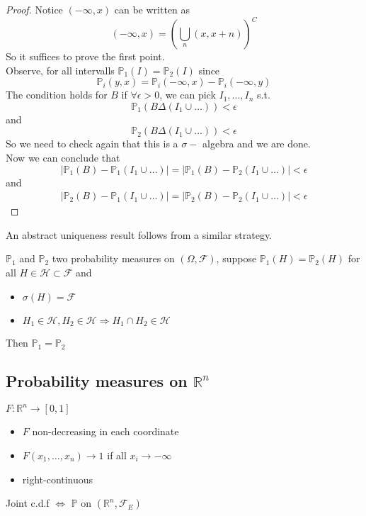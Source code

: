 \documentclass[../main.tex]{subfiles}
\begin{document}
\begin{proof}
	Notice $ ( - \infty , x) $ can be written as
	\[ 
		( - \infty , x) = ( \bigcup_n ( x,x+n)  )^{C}
	\]
	So it suffices to prove the first point.\\
	Observe, for all intervalls $ \mathbb{P}_1 ( I) = \mathbb{P}_2 ( I) $ since
	\[ 
		\mathbb{P}_i ( y,x) = \mathbb{P}_i ( - \infty , x) - \mathbb{P}_i ( - \infty , y) 
	\]
	The condition holds for $B$ if $\forall \epsilon>0$, we can pick $I_1,\ldots, I_n$ s.t.
	\[ 
		\mathbb{P}_1( B\Delta ( I_1\cup\ldots) ) < \epsilon
	\]
	and 
	\[ 
		\mathbb{P}_2( B\Delta( I_1\cup \ldots) ) <\epsilon
	\]
	So we need to check again that this is  a $\sigma-$ algebra and we are done.\\
	Now we can conclude that
	\[ 
		| \mathbb{P}_1( B) -\mathbb{P}_1( I_1\cup \ldots) | = | \mathbb{P}_1( B) - \mathbb{P}_2 (I_1\cup\ldots	 ) 	| <\epsilon
	\]
	and
	\begin{align*}
	| \mathbb{P}_2( B) -\mathbb{P}_1( I_1\cup \ldots) | = | \mathbb{P}_2( B) - \mathbb{P}_2 (I_1\cup\ldots	 ) 	| <\epsilon
	\end{align*}
\end{proof}
An abstract uniqueness result follows from a similar strategy.
\begin{thm}[Dynkin]
	$\mathbb{P}_1$ and $\mathbb{P}_2$ two probability measures on $( \Omega, \mathcal{F}) $, suppose $ \mathbb{P}_1( H) = \mathbb{P}_2( H) $ for all $H \in \mathcal{H} \subset \mathcal{F}$ and
	\begin{itemize}
		\item $\sigma( H) = \mathcal{F}$ 
		\item $H_1\in \mathcal{H}, H_2\in \mathcal{H} \Rightarrow H_1\cap H_2 \in \mathcal{H}$ 
	\end{itemize}
Then $ \mathbb{P}_1= \mathbb{P}_2$ 	
\end{thm}
\subsection{Probability measures on $ \mathbb{R}^n$ }
\begin{defn}[Joint c.d.f.]
	$F: \mathbb{R}^n\to [ 0,1] $ 
	\begin{itemize}
	\item $F$ non-decreasing in each coordinate
	\item $ F( x_1,\ldots,x_n) \to 1$ if all $x_i \to -\infty $ 
	\item right-continuous
	\end{itemize}
	
\end{defn}
\begin{thm}
	Joint c.d.f $\iff$  $\mathbb{P}$ on $ ( \mathbb{R}^n, \mathcal{F}_E) $ 	
\end{thm}
\end{document}
